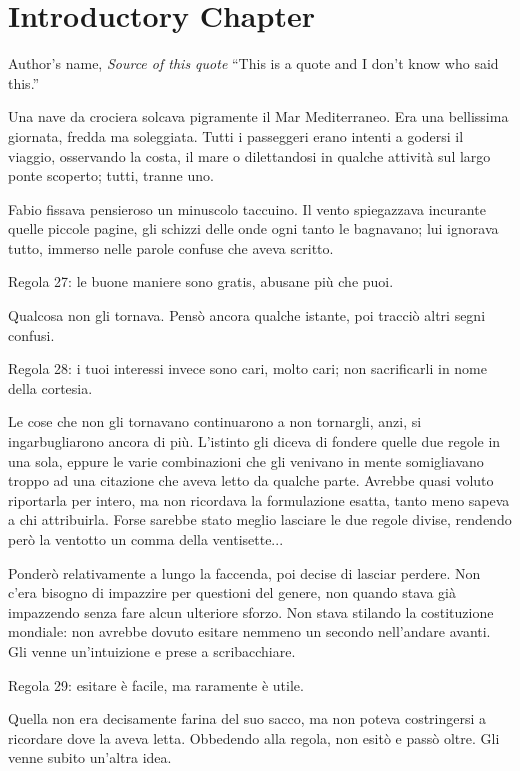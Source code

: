 \chapter{Introductory Chapter}

\begin{chapquote}{Author's name, \textit{Source of this quote}}
``This is a quote and I don't know who said this.''
\end{chapquote}

Una nave da crociera solcava pigramente il Mar Mediterraneo. Era una bellissima giornata, fredda ma soleggiata. Tutti i passeggeri erano intenti a godersi il viaggio, osservando la costa, il mare o dilettandosi in qualche attività sul largo ponte scoperto; tutti, tranne uno.

Fabio fissava pensieroso un minuscolo taccuino. Il vento spiegazzava incurante quelle piccole pagine, gli schizzi delle onde ogni tanto le bagnavano; lui ignorava tutto, immerso nelle parole confuse che aveva scritto.

Regola 27: le buone maniere sono gratis, abusane più che puoi.

Qualcosa non gli tornava. Pensò ancora qualche istante, poi tracciò altri segni confusi.

Regola 28: i tuoi interessi invece sono cari, molto cari; non sacrificarli in nome della cortesia.

Le cose che non gli tornavano continuarono a non tornargli, anzi, si ingarbugliarono ancora di più. L'istinto gli diceva di fondere quelle due regole in una sola, eppure le varie combinazioni che gli venivano in mente somigliavano troppo ad una citazione che aveva letto da qualche parte. Avrebbe quasi voluto riportarla per intero, ma non ricordava la formulazione esatta, tanto meno sapeva a chi attribuirla. Forse sarebbe stato meglio lasciare le due regole divise, rendendo però la ventotto un comma della ventisette...

Ponderò relativamente a lungo la faccenda, poi decise di lasciar perdere. Non c'era bisogno di impazzire per questioni del genere, non quando stava già impazzendo senza fare alcun ulteriore sforzo. Non stava stilando la costituzione mondiale: non avrebbe dovuto esitare nemmeno un secondo nell'andare avanti. Gli venne un'intuizione e prese a scribacchiare.

Regola 29: esitare è facile, ma raramente è utile.

Quella non era decisamente farina del suo sacco, ma non poteva costringersi a ricordare dove la aveva letta. Obbedendo alla regola, non esitò e passò oltre. Gli venne subito un'altra idea.

